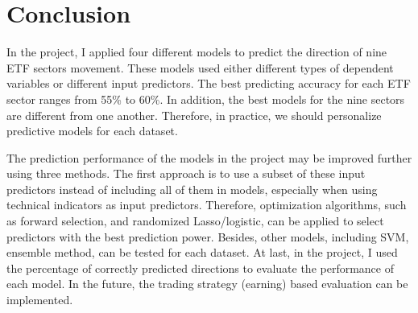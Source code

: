 \documentclass[letterpaper]{article}
\begin{document}
\section{Conclusion}
In the project, I applied four different models to predict the direction of nine
ETF sectors movement. These models used either different types of dependent
variables or different input predictors. The best predicting accuracy for each
ETF sector ranges from 55\% to 60\%. In addition, the best models for the nine
sectors are different from one another. Therefore, in practice, we should
personalize predictive models for each dataset.

The prediction performance of the models in the project may be improved
further using three methods. The first approach is to use a subset of these
input predictors instead of including all of them in models, especially when
using technical indicators as input predictors. Therefore, optimization
algorithms, such as forward selection, and randomized Lasso/logistic, can be
applied to select predictors with the best prediction power. Besides, other
models, including SVM, ensemble method, can be tested for each dataset. At last, in
the project, I used the percentage of correctly predicted directions to
evaluate the performance of each model. In the future, the trading strategy
(earning) based evaluation can be implemented.



\end{document}
